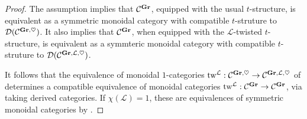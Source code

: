 \begin{proof}
  The assumption implies that $\mathcal{C}^{\operatorname{\mathbf{Gr}}}$, equipped with the usual $t$-structure, is equivalent as a symmetric monoidal category with compatible $t$-struture to $\mathcal{D}(\mathcal{C}^{\operatorname{\mathbf{Gr}}, \heartsuit})$.
  It also implies that $\mathcal{C}^{\operatorname{\mathbf{Gr}}}$, when equipped with the $\mathcal{L}$-twisted $t$-structure, is equivalent as a symmteric monoidal category with compatible $t$-struture to $\mathcal{D}(\mathcal{C}^{\operatorname{\mathbf{Gr}}, \mathcal{L}, \heartsuit})$.

  It follows that the equivalence of monoidal $1$-categories $\mathrm{tw}^{\mathcal{L}} : \mathcal{C}^{\operatorname{\mathbf{Gr}}, \heartsuit} \to \mathcal{C}^{\operatorname{\mathbf{Gr}}, \mathcal{L}, \heartsuit}$ of  determines a compatible equivalence of monoidal categories $\mathrm{tw}^{\mathcal{L}}: \mathcal{C}^{\operatorname{\mathbf{Gr}}} \to \mathcal{C}^{\operatorname{\mathbf{Gr}}}$, via taking derived categories.
  If $\chi(\mathcal{L}) = 1$, these are equivalences of symmetric monoidal categories by .
\end{proof}

